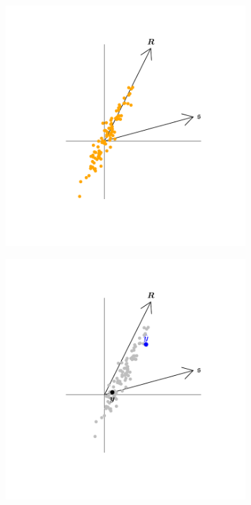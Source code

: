 \documentclass[12pt]{article}
\theoremstyle{definition}
\begin{document}
\begin{figure}[!p]
  \centering
  \begin{subfigure}[!h]{0.415\textwidth}
      \includegraphics[width=\textwidth]{Figs/InsampDir_1_George.pdf}
      \caption{}
  \end{subfigure}
  \begin{subfigure}[!h]{0.415\textwidth}
      \includegraphics[width=\textwidth]{Figs/InsampDir_2_George.pdf}

\end{subfigure}
\end{figure}
\end{document}
